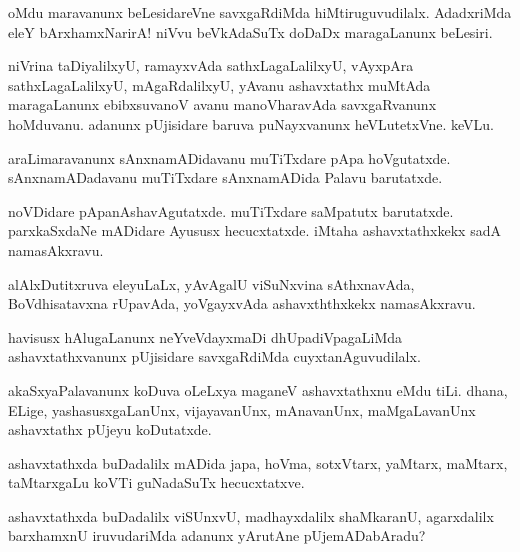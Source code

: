 \documentclass{article}
\begin{document}
\begin{mng}%
oMdu maravanunx beLesidareVne savxgaRdiMda hiMtiruguvudilalx. 
AdadxriMda eleY bArxhamxNarirA! niVvu beVkAdaSuTx doDaDx maragaLanunx 
beLesiri.
\end{mng}

\begin{mng}%
niVrina taDiyalilxyU, ramayxvAda sathxLagaLalilxyU, vAyxpAra 
sathxLagaLalilxyU, mAgaRdalilxyU, yAvanu ashavxtathx muMtAda 
maragaLanunx ebibxsuvanoV avanu manoVharavAda savxgaRvanunx hoMduvanu. 
adanunx pUjisidare baruva puNayxvanunx heVLutetxVne. keVLu.
\end{mng}

\begin{mng}%
araLimaravanunx sAnxnamADidavanu muTiTxdare pApa hoVgutatxde. 
sAnxnamADadavanu muTiTxdare sAnxnamADida Palavu barutatxde.
\end{mng}

\begin{mng}%
noVDidare pApanAshavAgutatxde. muTiTxdare saMpatutx barutatxde. 
parxkaSxdaNe mADidare Ayususx hecucxtatxde. iMtaha ashavxtathxkekx 
sadA namasAkxravu.
\end{mng}

\begin{mng}%
alAlxDutitxruva eleyuLaLx, yAvAgalU viSuNxvina sAthxnavAda, 
BoVdhisatavxna rUpavAda, yoVgayxvAda ashavxththxkekx namasAkxravu.
\end{mng}

\begin{mng}%
havisusx hAlugaLanunx neYveVdayxmaDi dhUpadiVpagaLiMda 
ashavxtathxvanunx pUjisidare savxgaRdiMda cuyxtanAguvudilalx.
\end{mng}

\begin{mng}%
akaSxyaPalavanunx koDuva oLeLxya maganeV ashavxtathxnu eMdu tiLi. 
dhana, ELige, yashasusxgaLanUnx, vijayavanUnx, mAnavanUnx, 
maMgaLavanUnx ashavxtathx pUjeyu koDutatxde.
\end{mng}

\begin{mng}%
ashavxtathxda buDadalilx mADida japa, hoVma, sotxVtarx, yaMtarx, 
maMtarx, taMtarxgaLu koVTi guNadaSuTx hecucxtatxve.
\end{mng}

\begin{mng}%
ashavxtathxda buDadalilx viSUnxvU, madhayxdalilx shaMkaranU, 
agarxdalilx barxhamxnU iruvudariMda adanunx yArutAne pUjemADabAradu?
\end{mng}
\end{document}
